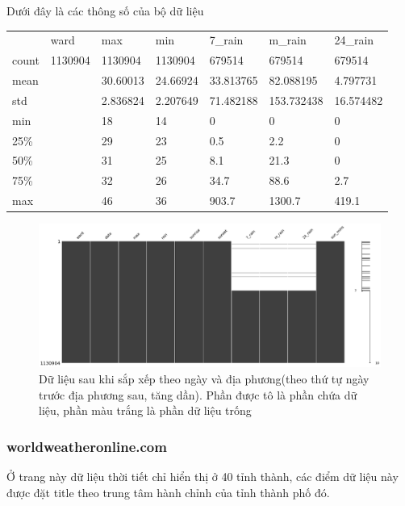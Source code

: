 \documentclass{article}
\begin{document}
Dưới đây là các thông số của bộ dữ liệu

\begin{table}[H]
	\begin{tabular}{lllllll}
		      & ward    & max      & min      & 7\_rain   & m\_rain    & 24\_rain  \\
		count & 1130904 & 1130904  & 1130904  & 679514    & 679514     & 679514    \\
		mean  &         & 30.60013 & 24.66924 & 33.813765 & 82.088195  & 4.797731  \\
		std   &         & 2.836824 & 2.207649 & 71.482188 & 153.732438 & 16.574482 \\
		min   &         & 18       & 14       & 0         & 0          & 0         \\
		25\%  &         & 29       & 23       & 0.5       & 2.2        & 0         \\
		50\%  &         & 31       & 25       & 8.1       & 21.3       & 0         \\
		75\%  &         & 32       & 26       & 34.7      & 88.6       & 2.7       \\
		max   &         & 46       & 36       & 903.7     & 1300.7     & 419.1
	\end{tabular}
\end{table}


\begin{figure}[H]
	\centering
	\includegraphics[width=6in]{images/missing.png}
	\caption{
		Dữ liệu sau khi sắp xếp theo ngày và địa phương(theo thứ tự ngày trước địa phương sau, tăng dần). Phần được tô là phần chứa dữ liệu, phần màu trắng là phần dữ liệu trống}
\end{figure}


\subsubsection{worldweatheronline.com}
Ở trang này dữ liệu thời tiết chỉ hiển thị ở 40 tỉnh thành, các điểm dữ liệu này được đặt title theo trung tâm hành chỉnh của tỉnh thành phố đó.
\end{document}
